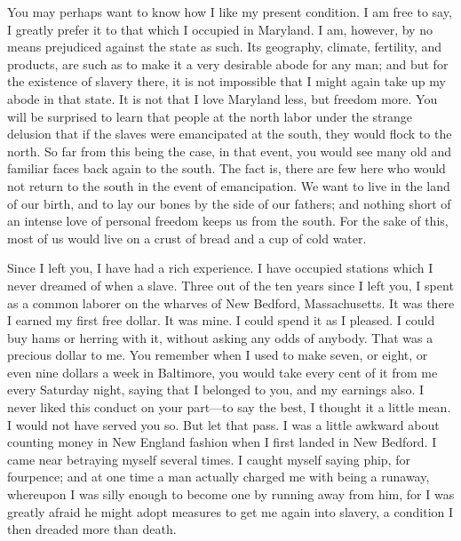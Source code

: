 You may perhaps want to know how I like my present condition. I am free
to say, I greatly prefer it to that which I occupied in Maryland. I am,
however, by no means prejudiced against the state as such. Its
geography, climate, fertility, and products, are such as to make it a
very desirable abode for any man; and but for the existence of slavery
there, it is not impossible that I might again take up my abode in that
state. It is not that I love Maryland less, but freedom more. You will
be surprised to learn that people at the north labor under the strange
delusion that if the slaves were emancipated at the south, they would
flock to the north. So far from this being the case, in that event, you
would see many old and familiar faces back again to the south. The fact
is, there are few here who would not return to the south in the event of
emancipation. We want to live in the land of our birth, and to lay our
bones by the side of our fathers; and nothing short of an intense love
of personal freedom keeps us from the south. For the sake of this, most
of us would live on a crust of bread and a cup of cold water.

Since I left you, I have had a rich experience. I have occupied stations
which I never dreamed of when a slave. Three out of the ten years since
I left you, I spent as a common laborer on the wharves of New Bedford,
Massachusetts. It was there I earned my first free dollar. It was mine.
I could spend it as I pleased. I could buy hams or herring with it,
without asking any odds of anybody. That was a precious dollar to me.
You remember when I used to make seven, or eight, or even nine dollars a
week in Baltimore, you would take every cent of it from me every
Saturday night, saying that I belonged to you, and my earnings also. I
never liked this conduct on your part---to say the best, I thought it a
little mean. I would not have served you so. But let that pass. I was a
little awkward about counting money in New England fashion when I first
landed in New Bedford. I came near betraying myself several times. I
caught myself saying phip, for fourpence; and at one time a man actually
charged me with being a runaway, whereupon I was silly enough to become
one by running away from him, for I was greatly afraid he might adopt
{\protect\hypertarget{425}{}{}}measures to get me again into slavery, a
condition I then dreaded more than death.

